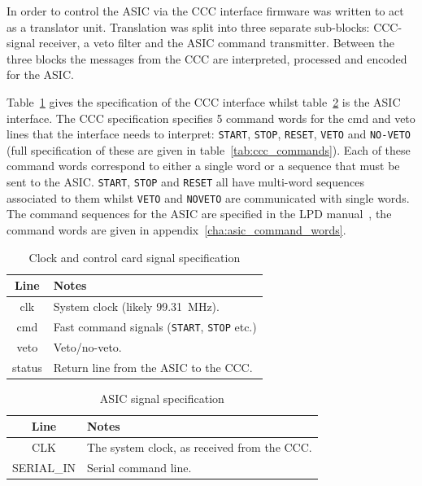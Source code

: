 \documentclass[]{report}
\begin{document}
    In order to control the ASIC via the CCC interface firmware was written to act as a translator unit. Translation was split into three separate sub-blocks: CCC-signal receiver, a veto filter and the ASIC command transmitter. Between the three blocks the messages from the CCC are interpreted, processed and encoded for the ASIC. 
    
    Table~\ref{tab:ccc_spec} gives the specification of the CCC interface whilst table~\ref{tab:asic_spec} is the ASIC interface. The CCC specification specifies 5 command words for the cmd and veto lines that the interface needs to interpret: \texttt{START}, \texttt{STOP}, \texttt{RESET}, \texttt{VETO} and \texttt{NO-VETO} (full specification of these are given in table~\ref{tab:ccc_commands}). Each of these command words correspond to either a single word or a sequence that must be sent to the ASIC. \texttt{START}, \texttt{STOP} and \texttt{RESET} all have multi-word sequences associated to them whilst \texttt{VETO} and \texttt{NOVETO} are communicated with single words. The command sequences for the ASIC are specified in the LPD manual~\cite{LPD MANUAL}, the command words are given in appendix~\ref{cha:asic_command_words}.
    
    \begin{table}
        \begin{center}
            \begin{tabular}{c|l}
                Line & Notes \\
                \hline
                clk    & System clock (likely 99.31~MHz).        \\
                cmd    & Fast command signals (\texttt{START}, \texttt{STOP} etc.) \\
                veto   & Veto/no-veto.                                             \\
                status & Return line from the ASIC to the CCC.                     \\
            \end{tabular}
        \end{center}
        \caption{Clock and control card signal specification}
        \label{tab:ccc_spec}
    \end{table}

    \begin{table}
        \begin{center}
            \begin{tabular}{c|l}
                Line       & Notes                                       \\
                \hline
                CLK        & The system clock, as received from the CCC. \\
                SERIAL\_IN & Serial command line.                        \\
            \end{tabular}
        \end{center}
        \caption{ASIC signal specification}
        \label{tab:asic_spec}
    \end{table}
  
\end{document}
